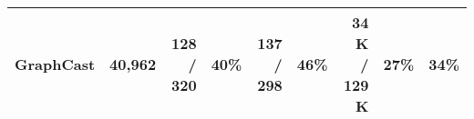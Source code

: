 \begin{tabular}{lrrrrrrrr}
\multicolumn{1}{l|}{GraphCast}     & \multicolumn{1}{r|}{40,962}                                    & 128 / 320                                                                                & \multicolumn{1}{r|}{40\%}                                                                & 137 / 298                                                                                         & \multicolumn{1}{r|}{46\%}                                                                 & 34 K / 129 K                                                                                       & \multicolumn{1}{r|}{27\%}                                                                     & 34\%                                                                                         \\ \hline
\end{tabular}